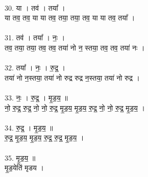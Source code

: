 \\
30. या । तव॑ । तया᳚ ।\\
या तव॒ तव॒ या या तव॒ तया॒ तया॒ तव॒ या या तव॒ तया᳚ ।\\
\\
31. तव॑ । तया᳚ । नः॒ ।\\
तव॒ तया॒ तया॒ तव॒ तव॒ तया॑ नो न॒ स्तया॒ तव॒ तव॒ तया॑ नः ।\\
\\
32. तया᳚ । नः॒ । रु॒द्र॒ ।\\
तया॑ नो न॒स्तया॒ तया॑ नो रुद्र रुद्र न॒स्तया॒ तया॑ नो रुद्र ।\\
\\
33. नः॒ । रु॒द्र॒ । मृ॒ड॒य॒ ॥\\
नो॒ रु॒द्र॒ रु॒द्र॒ नो॒ नो॒ रु॒द्र॒ मृ॒ड॒य॒ मृ॒ड॒य॒ रु॒द्र॒ नो॒ नो॒ रु॒द्र॒ मृ॒ड॒य॒ ।\\
\\
34. रु॒द्र॒ । मृ॒ड॒य॒ ॥\\
रु॒द्र॒ मृ॒ड॒य॒ मृ॒ड॒य॒ रु॒द्र॒ रु॒द्र॒ मृ॒ड॒य॒ ।\\
\\
35. मृ॒ड॒य॒ ॥\\
मृ॒ड॒येति॑ मृडय ।\\
\\
